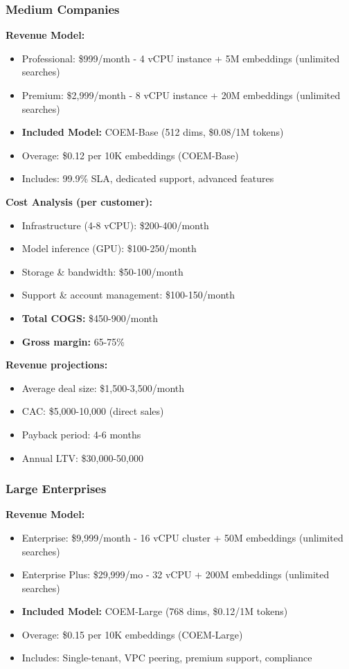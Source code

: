 \subsubsection{Medium Companies}

\textbf{Revenue Model:}
\begin{itemize}[noitemsep]
    \item Professional: \$999/month - 4 vCPU instance + 5M embeddings (unlimited searches)
    \item Premium: \$2,999/month - 8 vCPU instance + 20M embeddings (unlimited searches)
    \item \textbf{Included Model:} COEM-Base (512 dims, \$0.08/1M tokens)
    \item Overage: \$0.12 per 10K embeddings (COEM-Base)
    \item Includes: 99.9\% SLA, dedicated support, advanced features
\end{itemize}

\textbf{Cost Analysis (per customer):}
\begin{itemize}[noitemsep]
    \item Infrastructure (4-8 vCPU): \$200-400/month
    \item Model inference (GPU): \$100-250/month
    \item Storage \& bandwidth: \$50-100/month
    \item Support \& account management: \$100-150/month
    \item \textbf{Total COGS:} \$450-900/month
    \item \textbf{Gross margin:} 65-75\%
\end{itemize}

\textbf{Revenue projections:}
\begin{itemize}[noitemsep]
    \item Average deal size: \$1,500-3,500/month
    \item CAC: \$5,000-10,000 (direct sales)
    \item Payback period: 4-6 months
    \item Annual LTV: \$30,000-50,000
\end{itemize}

\subsubsection{Large Enterprises}

\textbf{Revenue Model:}
\begin{itemize}[noitemsep]
    \item Enterprise: \$9,999/month - 16 vCPU cluster + 50M embeddings (unlimited searches)
    \item Enterprise Plus: \$29,999/mo - 32 vCPU + 200M embeddings (unlimited searches)
    \item \textbf{Included Model:} COEM-Large (768 dims, \$0.12/1M tokens)
    \item Overage: \$0.15 per 10K embeddings (COEM-Large)
    \item Includes: Single-tenant, VPC peering, premium support, compliance
\end{itemize}

